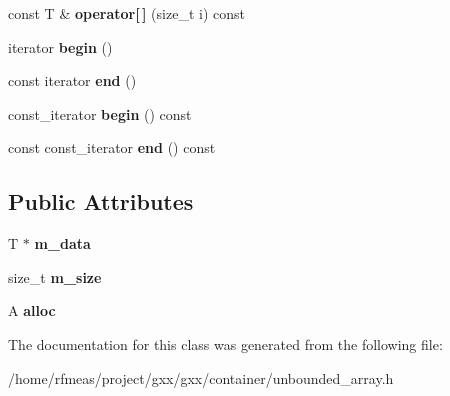 \begin{DoxyCompactItemize}
\item 
const T \& {\bfseries operator\mbox{[}$\,$\mbox{]}} (size\+\_\+t i) const \hypertarget{classgxx_1_1unbounded__array_acb406af709fee7c4b1d18b738f47de1d}{}\label{classgxx_1_1unbounded__array_acb406af709fee7c4b1d18b738f47de1d}

\item 
iterator {\bfseries begin} ()\hypertarget{classgxx_1_1unbounded__array_a2a992176d31b0092eaf32cdc65d20d1a}{}\label{classgxx_1_1unbounded__array_a2a992176d31b0092eaf32cdc65d20d1a}

\item 
const iterator {\bfseries end} ()\hypertarget{classgxx_1_1unbounded__array_af225dae1f76d6244695be3f36da8e307}{}\label{classgxx_1_1unbounded__array_af225dae1f76d6244695be3f36da8e307}

\item 
const\+\_\+iterator {\bfseries begin} () const \hypertarget{classgxx_1_1unbounded__array_a2eb95b659e919b4bfbe4a774f7e58591}{}\label{classgxx_1_1unbounded__array_a2eb95b659e919b4bfbe4a774f7e58591}

\item 
const const\+\_\+iterator {\bfseries end} () const \hypertarget{classgxx_1_1unbounded__array_ad58123d4818cc9837d61aada49eb6697}{}\label{classgxx_1_1unbounded__array_ad58123d4818cc9837d61aada49eb6697}

\end{DoxyCompactItemize}
\subsection*{Public Attributes}
\begin{DoxyCompactItemize}
\item 
T $\ast$ {\bfseries m\+\_\+data}\hypertarget{classgxx_1_1unbounded__array_acec6bf1a63bc74885a7001d14ea72cb7}{}\label{classgxx_1_1unbounded__array_acec6bf1a63bc74885a7001d14ea72cb7}

\item 
size\+\_\+t {\bfseries m\+\_\+size}\hypertarget{classgxx_1_1unbounded__array_aa11e5e50779b5e9b63e578eda02d771b}{}\label{classgxx_1_1unbounded__array_aa11e5e50779b5e9b63e578eda02d771b}

\item 
A {\bfseries alloc}\hypertarget{classgxx_1_1unbounded__array_a07824235fb44824edd1d12bca3013f0c}{}\label{classgxx_1_1unbounded__array_a07824235fb44824edd1d12bca3013f0c}

\end{DoxyCompactItemize}


The documentation for this class was generated from the following file\+:\begin{DoxyCompactItemize}
\item 
/home/rfmeas/project/gxx/gxx/container/unbounded\+\_\+array.\+h\end{DoxyCompactItemize}
